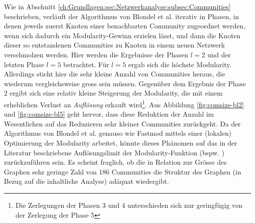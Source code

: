 Wie in Abschnitt
\ref{ch:Grundlagen:sec:Netzwerkanalyse:subsec:Communities}
beschrieben, verl\"auft der Algorithmus von Blondel et al. iterativ in
Phasen, in denen jeweils zuerst Knoten einer benachbarten Community
zugeordnet werden, wenn sich dadurch ein Modularity-Gewinn erzielen
l\"asst, und dann die Knoten dieser so entstandenen Communities zu
Knoten in einem neuen Netzwerk verschmolzen werden. Hier werden die
Ergebnisse der Phasen $l=2$ und der letzten Phase $l=5$
betrachtet. F\"ur $l=5$ ergab sich die h\"ochste
Modularity. Allerdings sticht hier die sehr kleine Anzahl von
Communities heraus, die wiederum vergleichsweise gross sein
m\"ussen. Gegen\"uber dem Ergebnis der Phase 2 ergibt sich eine
relativ kleine Steigerung der Modularity, die mit einem erheblichen
Verlust an \emph{Aufl\"osung} erkauft wird\footnote{Die Zerlegungen
  der Phasen 3 und 4 unterschieden sich nur geringf\"ugig von der
  Zerlegung der Phase 5}. Aus Abbildung \ref{fig:comsize-bl2} und
\ref{fig:comsize-bl5} geht hervor, dass diese Reduktion der Anzahl im
Wesentlichen auf das Reduzieren sehr kleiner Communities
zur\"uckgeht. Da der Algorithmus von Blondel et al. genauso wie
Fastmod mittels einer (lokalen) Optimierung der Modularity arbeitet,
k\"onnte dieses Ph\"anomen auf das in der Literatur beschriebene
Aufl\"osungslimit der Modularity-Funktion (bspw. \cite{Fortunato2007}
\cite{Good2009}) zur\"uckzuf\"uhren sein. Es scheint fraglich, ob die
in Relation zur Gr\"osse des Graphen sehr geringe Zahl von 186
Communities die Struktur des Graphen (in Bezug auf die inhaltliche
Analyse) ad\"aquat wiedergibt.

